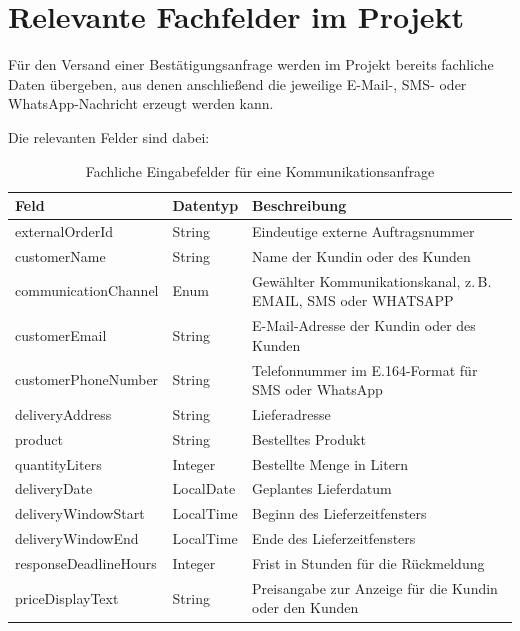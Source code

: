 \documentclass[12pt,a4paper]{article}
\begin{document}
\section{Relevante Fachfelder im Projekt}

Für den Versand einer Bestätigungsanfrage werden im Projekt bereits
fachliche Daten übergeben, aus denen anschließend die jeweilige
E-Mail-, SMS- oder WhatsApp-Nachricht erzeugt werden kann.

Die relevanten Felder sind dabei:

\begin{table}[h]
    \centering
    \begin{tabularx}{\textwidth}{l l X}
        \toprule
        \textbf{Feld} & \textbf{Datentyp} & \textbf{Beschreibung} \\
        \midrule
        externalOrderId
        & String
        & Eindeutige externe Auftragsnummer \\

        customerName
        & String
        & Name der Kundin oder des Kunden \\

        communicationChannel
        & Enum
        & Gewählter Kommunikationskanal, z.\,B. EMAIL, SMS oder WHATSAPP \\

        customerEmail
        & String
        & E-Mail-Adresse der Kundin oder des Kunden \\

        customerPhoneNumber
        & String
        & Telefonnummer im E.164-Format für SMS oder WhatsApp \\

        deliveryAddress
        & String
        & Lieferadresse \\

        product
        & String
        & Bestelltes Produkt \\

        quantityLiters
        & Integer
        & Bestellte Menge in Litern \\

        deliveryDate
        & LocalDate
        & Geplantes Lieferdatum \\

        deliveryWindowStart
        & LocalTime
        & Beginn des Lieferzeitfensters \\

        deliveryWindowEnd
        & LocalTime
        & Ende des Lieferzeitfensters \\

        responseDeadlineHours
        & Integer
        & Frist in Stunden für die Rückmeldung \\

        priceDisplayText
        & String
        & Preisangabe zur Anzeige für die Kundin oder den Kunden \\
        \bottomrule
    \end{tabularx}
    \caption{Fachliche Eingabefelder für eine Kommunikationsanfrage}
\end{table}
\end{document}
